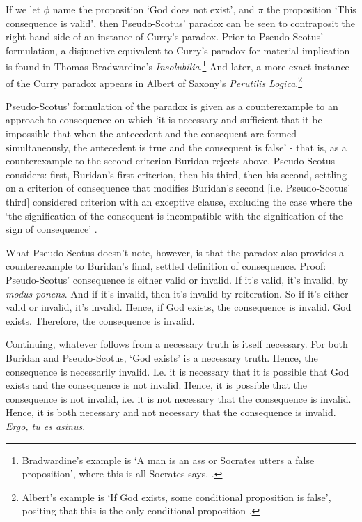 \documentclass[]{article}
\begin{document}
If we let $\phi$ name the proposition `God does not exist', and $\pi$ the proposition `This consequence is valid', then Pseudo-Scotus' paradox can be seen to contraposit the right-hand side of an instance of Curry's paradox. Prior to Pseudo-Scotus' formulation, a disjunctive equivalent to Curry's paradox for material implication is found in Thomas Bradwardine's \textit{Insolubilia}.\footnote{Bradwardine's example is `A man is an ass or Socrates utters a false proposition', where this is all Socrates says. \cite[6.3, p. 97]{Bradwardine2010}.} And later, a more exact instance of the Curry paradox appears in Albert of Saxony's \textit{Perutilis Logica}.\footnote{Albert's example is `If God exists, some conditional proposition is false', positing that this is the only conditional proposition \cite[pp. 359-360]{Albert1988}.}

Pseudo-Scotus' formulation of the paradox is given as a counterexample to an approach to consequence on which `it is necessary and sufficient that it be impossible that when the antecedent and the consequent are formed simultaneously, the antecedent is true and the consequent is false' \cite[p. 226]{Pseudo-Scotus2001} - that is, as a counterexample to the second criterion Buridan rejects above. Pseudo-Scotus considers: first, Buridan's first criterion, then his third, then his second, settling on a criterion of consequence that modifies Buridan's second [i.e. Pseudo-Scotus' third] considered criterion with an exceptive clause, excluding the case where the `the signification of the consequent is incompatible with the signification of the sign of consequence' \cite[p. 228]{Pseudo-Scotus2001}.

What Pseudo-Scotus doesn't note, however, is that the paradox also provides a counterexample to Buridan's final, settled definition of consequence. Proof: Pseudo-Scotus' consequence is either valid or invalid. If it's valid, it's invalid, by \textit{modus ponens}. And if it's invalid, then it's invalid by reiteration. So if it's either valid or invalid, it's invalid. Hence, if God exists, the consequence is invalid. God exists. Therefore, the consequence is invalid.

Continuing, whatever follows from a necessary truth is itself necessary. For both Buridan and Pseudo-Scotus, `God exists' is a necessary truth. Hence, the consequence is necessarily invalid. I.e. it is necessary that it is possible that God exists and the consequence is not invalid. Hence, it is possible that the consequence is not invalid, i.e. it is not necessary that the consequence is invalid. Hence, it is both necessary and not necessary that the consequence is invalid. \textit{Ergo, tu es asinus}.
\end{document}
